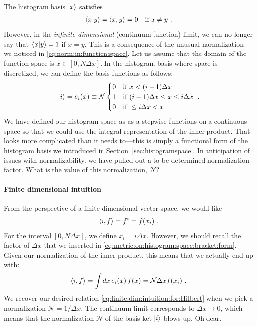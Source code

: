 \documentclass[12pt, oneside]{report}    %
\begin{document}
The histogram basis $\left|x\right\rangle$ satisfies
\begin{align}
    \langle x | y \rangle = \langle x, y \rangle = 0 \quad \textnormal{if } x\neq y \ .
\end{align}
However, in the \emph{infinite dimensional} (continuum function) limit, we can no longer say that $\langle x | y \rangle = 1$ if $x=y$. This is a consequence of the unusual normalization we noticed in \eqref{eq:norm:in:function:space}. Let us assume that the domain of the function space is $x\in [0,N\Delta x]$. In the histogram basis where space is discretized, we can define the basis functions as follows:
\begin{align}
    \left|i\right\rangle = 
    e_i(x) \equiv 
    \mathcal N
    \begin{cases}
    0 &\textnormal{if } x< (i-1)\Delta x\\
    1 &\textnormal{if } (i-1)\Delta x \leq x \leq i\Delta x\\
    0 &\textnormal{if } \leq i\Delta x < x 
    \end{cases}    \ .
\end{align}
We have defined our histogram space as as a stepwise functions on a continuous space so that we could use the integral representation of the inner product. That looks more complicated than it needs to---this is simply a functional form of the histogram basis we introduced in Section~\ref{sec:histogramspace}. In anticipation of issues with normalizability, we have pulled out a to-be-determined normalization factor. What is the value of this normalization, $\mathcal N$? 

\paragraph{Finite dimensional intuition}
From the perspective of a finite dimensional vector space, we would like
\begin{align}
    \langle i,f\rangle = f^i = f(x_i) \ .
    \label{eq:finite:dim:intuition:for:Hilbert}
\end{align}
For the interval $[0,N\Delta x]$, we define $x_i = i\Delta x$. However, we should recall the factor of $\Delta x$ that we inserted in \eqref{eq:metric:on:histogram:space:bracket:form}. 
Given our normalization of the inner product, this means that we actually end up with:
\begin{align}
    \la i, f\ra = \int dx\, e_i(x)\, f(x) = \mathcal N \Delta x f(x_i) \ .
    \label{eq:basis:normalization:of:function:space}
\end{align}
We recover our desired relation \eqref{eq:finite:dim:intuition:for:Hilbert} when we pick a normalization $\mathcal N = 1/\Delta x$. The continuum limit corresponds to $\Delta x \to 0$, which means that the normalization $\mathcal N$ of the basis ket $\left|i\right\rangle$ blows up. Oh dear. 
\end{document}
